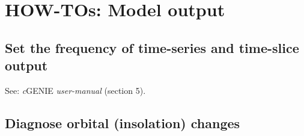 \documentclass[10pt,twoside]{article}
\begin{document}
\newpage
\section{HOW-TOs: Model output}\label{how-to-2}


\subsection{Set the frequency of time-series and time-slice output}\label{how-to-2a}

See: \textit{c}GENIE \textit{user-manual} (section 5).


\subsection{Diagnose orbital (insolation) changes}\label{how-to-2b}
\end{document}
